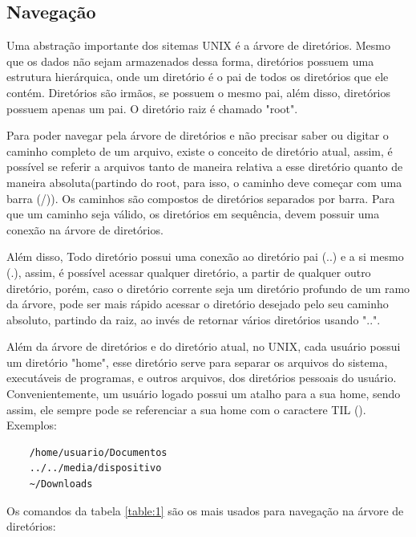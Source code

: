 \documentclass[oneside, 11 pt]{article}
\begin{document}
	\subsection{Navegação}
	Uma abstração importante dos sitemas UNIX é a árvore de diretórios. Mesmo que os dados não sejam armazenados dessa forma, diretórios possuem uma estrutura hierárquica, onde um diretório é o pai de todos os diretórios que ele contém. Diretórios são irmãos, se possuem o mesmo pai, além disso, diretórios possuem apenas um pai. O diretório raiz é chamado "root".
	
	Para poder navegar pela árvore de diretórios e não precisar saber ou digitar o caminho completo de um arquivo, existe o conceito de diretório atual, assim, é possível se referir a arquivos tanto de maneira relativa a esse diretório quanto de maneira absoluta(partindo do root, para isso, o caminho deve começar com uma barra (/)). Os caminhos são compostos de diretórios separados por barra. Para que um caminho seja válido, os diretórios em sequência, devem possuir uma conexão na árvore de diretórios.
	
	Além disso, Todo diretório possui uma conexão ao diretório pai (..) e a si mesmo (.), assim, é possível acessar qualquer diretório, a partir de qualquer outro diretório, porém, caso o diretório corrente seja um diretório profundo de um ramo da árvore, pode ser mais rápido acessar o diretório desejado pelo seu caminho absoluto, partindo da raiz, ao invés de retornar vários diretórios usando "..".
	
	Além da árvore de diretórios e do diretório atual, no UNIX, cada usuário possui um diretório "home", esse diretório serve para separar os arquivos do sistema, executáveis de programas, e outros arquivos, dos diretórios pessoais do usuário. Convenientemente, um usuário logado possui um atalho para a sua home, sendo assim, ele sempre pode se referenciar a sua home com o caractere TIL (\texttildelow).
	Exemplos: 
	\begin{lstlisting}
	/home/usuario/Documentos
	../../media/dispositivo
	~/Downloads
	\end{lstlisting}
	Os comandos da tabela \ref{table:1} são os mais usados para navegação na árvore de diretórios:
	
\end{document}
